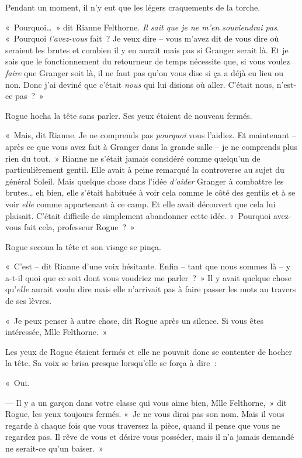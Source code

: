Pendant un moment, il n'y eut que les légers craquements de la torche.

«~Pourquoi…~»
dit Rianne Felthorne.
\emph{Il sait que je ne m'en souviendrai pas}.
«~Pourquoi \emph{l'avez-vous} fait~?
Je veux dire -- vous m'avez dit de vous dire où seraient les brutes et combien il y en aurait mais pas si Granger serait là.
Et je sais que le fonctionnement du retourneur de temps nécessite que, si vous voulez \emph{faire} que Granger soit là, il ne faut pas qu'on vous dise si ça a déjà eu lieu ou non.
Donc j'ai deviné que c'était \emph{nous} qui lui disions où aller.
C'était nous, n'est-ce pas~?~»

Rogue hocha la tête sans parler.
Ses yeux étaient de nouveau fermés.

«~Mais, dit Rianne.
Je ne comprends pas \emph{pourquoi} vous l'aidiez.
Et maintenant -- après ce que vous avez fait à Granger dans la grande salle -- je ne comprends plus rien du tout.~»
Rianne ne s'était jamais considéré comme quelqu'un de particulièrement gentil.
Elle avait à peine remarqué la controverse au sujet du général Soleil.
Mais quelque chose dans l'idée \emph{d'aider} Granger à combattre les brutes… eh bien, elle s'était habituée à voir cela comme le côté des gentils et à se voir \emph{elle} comme appartenant à ce camp.
Et elle avait découvert que cela lui plaisait.
C'était difficile de simplement abandonner cette idée.
«~Pourquoi avez-vous fait cela, professeur Rogue~?~»

Rogue secoua la tête et son visage se pinça.

«~C'est -- dit Rianne d'une voix hésitante.
Enfin -- tant que nous sommes là -- y a-t-il quoi que ce soit dont vous voudriez me parler~?~»
Il y avait quelque chose qu'\emph{elle} aurait voulu dire mais elle n'arrivait pas à faire passer les mots au travers de ses lèvres.

«~Je peux penser à autre chose, dit Rogue après un silence.
Si vous êtes intéressée, Mlle Felthorne.~»

Les yeux de Rogue étaient fermés et elle ne pouvait donc se contenter de hocher la tête.
Sa voix se brisa presque lorsqu'elle se força à dire~:

«~Oui.

--- Il y a un garçon dans votre classe qui vous aime bien, Mlle Felthorne,~» dit Rogue, les yeux toujours fermés.
«~Je ne vous dirai pas son nom.
Mais il vous regarde à chaque fois que vous traversez la pièce, quand il pense que vous ne regardez pas.
Il rêve de vous et désire vous posséder, mais il n'a jamais demandé ne serait-ce qu'un baiser.~»

